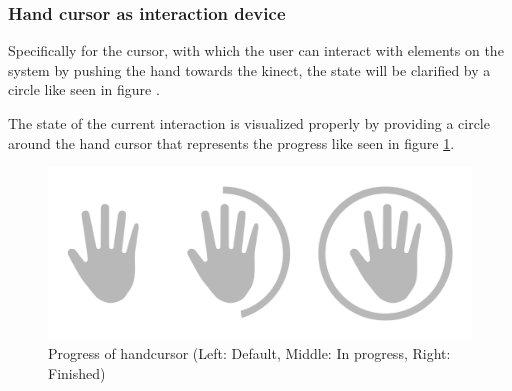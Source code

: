\subsubsection{Hand cursor as interaction device}
Specifically for the cursor, with which the user can interact with elements on the system by pushing the hand towards the kinect, the state will be clarified by a circle like seen in figure .

The state of the current interaction is visualized properly by providing a circle around the hand cursor that represents the progress like seen in figure \ref{fig:handcursorProgress}.
\begin{figure}[htb]
	\centering
	\begin{minipage}[t]{1\linewidth}
		\centering
		\includegraphics[width=0.6\linewidth]{Pictures/handcursorProgress}
		\caption{Progress of handcursor (Left: Default, Middle: In progress, Right: Finished)}
		\label{fig:handcursorProgress}
	\end{minipage}
\end{figure}